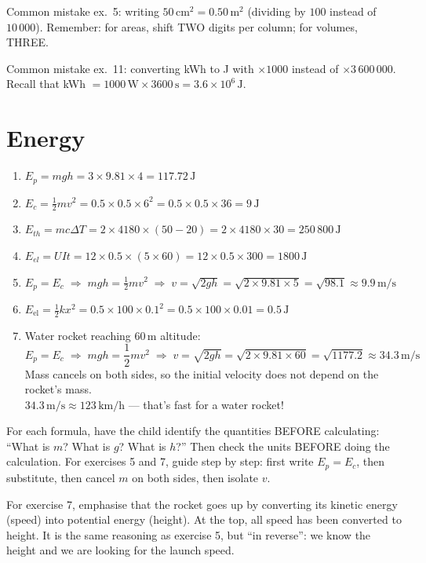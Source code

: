 \documentclass[11pt,a4paper]{article}
\newcommand{\corrbox}[1]{
\begin{tcolorbox}[colback=correctgreen!8!white,colframe=correctgreen!60!black]
#1
\end{tcolorbox}
}
\newcommand{\tipbox}[1]{
\begin{tcolorbox}[colback=tipblue!8!white,colframe=tipblue!60!black,title=\textbf{How to explain}]
#1
\end{tcolorbox}
}
\newcommand{\warnbox}[1]{
\begin{tcolorbox}[colback=warnred!8!white,colframe=warnred!60!black,title=\textbf{Common mistakes}]
#1
\end{tcolorbox}
}
\begin{document}
\warnbox{
Common mistake ex.~5: writing $50\,\text{cm}^{2} = 0.50\,\text{m}^{2}$ (dividing by $100$ instead of $10\,000$). Remember: for areas, shift TWO digits per column; for volumes, THREE.

\vspace{0.2cm}
Common mistake ex.~11: converting kWh to J with $\times 1000$ instead of $\times 3\,600\,000$. Recall that kWh $= 1000\,\text{W} \times 3600\,\text{s} = 3.6 \times 10^{6}\,\text{J}$.
}

\section{Energy}

\corrbox{
\begin{enumerate}
\item $E_p = mgh = 3 \times 9.81 \times 4 = 117.72\,\text{J}$
\item $E_c = \frac{1}{2}mv^{2} = 0.5 \times 0.5 \times 6^{2} = 0.5 \times 0.5 \times 36 = 9\,\text{J}$
\item $E_{th} = mc\Delta T = 2 \times 4180 \times (50 - 20) = 2 \times 4180 \times 30 = 250\,800\,\text{J}$
\item $E_{el} = UIt = 12 \times 0.5 \times (5 \times 60) = 12 \times 0.5 \times 300 = 1800\,\text{J}$
\item $E_p = E_c \;\Rightarrow\; mgh = \frac{1}{2}mv^{2} \;\Rightarrow\; v = \sqrt{2gh} = \sqrt{2 \times 9.81 \times 5} = \sqrt{98.1} \approx 9.9\,\text{m/s}$
\item $E_{\text{el}} = \frac{1}{2}kx^{2} = 0.5 \times 100 \times 0.1^{2} = 0.5 \times 100 \times 0.01 = 0.5\,\text{J}$
\item Water rocket reaching $60\,\text{m}$ altitude:
\[E_p = E_c \;\Rightarrow\; mgh = \frac{1}{2}mv^{2} \;\Rightarrow\; v = \sqrt{2gh} = \sqrt{2 \times 9.81 \times 60} = \sqrt{1177.2} \approx 34.3\,\text{m/s}\]
Mass cancels on both sides, so the initial velocity does not depend on the rocket's mass.\\
$34.3\,\text{m/s} \approx 123\,\text{km/h}$ --- that's fast for a water rocket!
\end{enumerate}
}

\tipbox{
For each formula, have the child identify the quantities BEFORE calculating: ``What is $m$? What is $g$? What is $h$?'' Then check the units BEFORE doing the calculation. For exercises 5 and 7, guide step by step: first write $E_p = E_c$, then substitute, then cancel $m$ on both sides, then isolate $v$.

\vspace{0.2cm}
For exercise 7, emphasise that the rocket goes up by converting its kinetic energy (speed) into potential energy (height). At the top, all speed has been converted to height. It is the same reasoning as exercise 5, but ``in reverse'': we know the height and we are looking for the launch speed.
}
\end{document}
